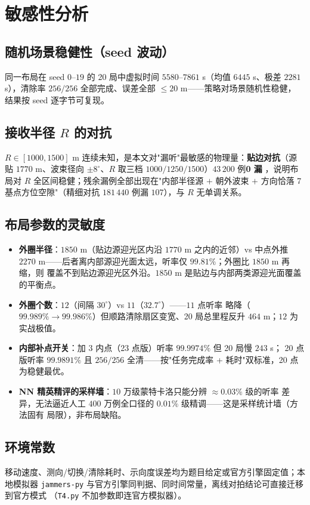 \section{敏感性分析}

\subsection{随机场景稳健性（seed 波动）}

同一布局在 seed $0$--$19$ 的 20 局中虚拟时间 $5580$--$7861$ s（均值 $6445$ s、极差
$2281$ s），清除率 $256/256$ 全部完成、误差全部 $\le 20$ m——策略对场景随机性稳健，
结果按 seed 逐字节可复现。

\subsection{接收半径 $R$ 的对抗}

$R\in[1000,1500]$ m 连续未知，是本文对"漏听"最敏感的物理量：\textbf{贴边对抗}（源贴
$1770$ m、波束径向 $\pm 8^\circ$、$R$ 取三档 $1000/1250/1500$）$43\,200$ 例\textbf{0 漏}
，说明布局对 $R$ 全区间稳健；残余漏例全部出现在"内部半径源 $+$ 朝外波束 $+$ 方向恰落
7 基点方位空隙"（精细对抗 $181\,440$ 例漏 $107$），与 $R$ 无单调关系。

\subsection{布局参数的灵敏度}

\begin{itemize}
  \item \textbf{外圈半径}：$1850$ m（贴边源迎光区内沿 $1770$ m 之内的近邻）vs 中点外推
        $2270$ m——后者离内部源迎光面太远，听率仅 $99.81\%$；外圈比 $1850$ m 再缩，则
        覆盖不到贴边源迎光区外沿。$1850$ m 是贴边与内部两类源迎光面覆盖的平衡点。
  \item \textbf{外圈个数}：$12$（间隔 $30^\circ$）vs $11$（$32.7^\circ$）——$11$ 点听率
        略降（$99.989\% \to 99.986\%$）但顺路清除扇区变宽、20 局总里程反升 $464$ m；$12$
        为实战极值。
  \item \textbf{内部补点开关}：加 $3$ 内点（23 点版）听率 $99.9974\%$ 但 20 局慢 $243$ s；
        20 点版听率 $99.9891\%$ 且 $256/256$ 全清——按"任务完成率 + 耗时"双标准，20 点
        为稳健最优。
  \item \textbf{NN 精英精评的采样墙}：$10$ 万级蒙特卡洛只能分辨 $\approx 0.03\%$ 级的听率
        差异，无法逼近人工 $400$ 万例全口径的 $0.01\%$ 级精调——这是采样统计墙（方法固有
        局限），非布局缺陷。
\end{itemize}

\subsection{环境常数}

移动速度、测向/切换/清除耗时、示向度误差均为题目给定或官方引擎固定值；本地模拟器
\texttt{jammers-py} 与官方引擎同判据、同时间常量，离线对拍结论可直接迁移到官方模式
（\texttt{T4.py} 不加参数即连官方模拟器）。